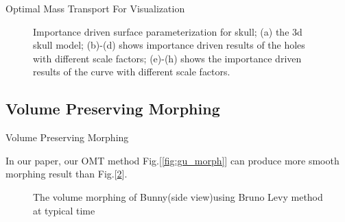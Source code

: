 \documentclass{beamer}
\theoremstyle{definition}
\begin{document}
\begin{frame}{Optimal Mass Transport For Visualization}
\begin{figure}
\centering
{}
\caption{Importance driven surface parameterization for skull; (a) the 3d skull model; (b)-(d) shows importance driven results of the holes with different scale factors; (e)-(h) shows the importance driven results of the curve with different scale factors.}
\label{fig:roi_skull}
\end{figure}
\end{frame}



\subsection{Volume Preserving Morphing}


\begin{frame}{Volume Preserving Morphing}

In our paper\cite{su2016volume}, our OMT method Fig.[\ref{fig:gu_morph}] can produce more smooth morphing result than Fig.[\ref{fig:bruno_morph}].

\begin{figure}
\centering
{}
\caption{The volume morphing of Bunny(side view)using Bruno Levy method at typical time}
\label{fig:bruno_morph}
\end{figure}
\end{frame}
\end{document}
